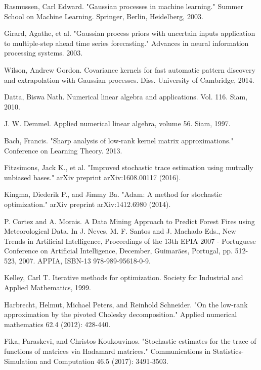 \documentclass{article}
\begin{document}
\begin{thebibliography}{1}

Rasmussen, Carl Edward. "Gaussian processes in machine learning." Summer School on Machine Learning. Springer, Berlin, Heidelberg, 2003.

Girard, Agathe, et al. "Gaussian process priors with uncertain inputs application to multiple-step ahead time series forecasting." Advances in neural information processing systems. 2003.

Wilson, Andrew Gordon. Covariance kernels for fast automatic pattern discovery and extrapolation with Gaussian processes. Diss. University of Cambridge, 2014.

Datta, Biswa Nath. Numerical linear algebra and applications. Vol. 116. Siam, 2010.

J. W. Demmel. Applied numerical linear algebra, volume 56. Siam, 1997. 

Bach, Francis. "Sharp analysis of low-rank kernel matrix approximations." Conference on Learning Theory. 2013.

Fitzsimons, Jack K., et al. "Improved stochastic trace estimation using mutually unbiased bases." arXiv preprint arXiv:1608.00117 (2016).

Kingma, Diederik P., and Jimmy Ba. "Adam: A method for stochastic optimization." arXiv preprint arXiv:1412.6980 (2014).

P. Cortez and A. Morais. A Data Mining Approach to Predict Forest Fires using Meteorological Data. In J. Neves, M. F. Santos and J. Machado Eds., New Trends in Artificial Intelligence, Proceedings of the 13th EPIA 2007 - Portuguese Conference on Artificial Intelligence, December, Guimarães, Portugal, pp. 512-523, 2007. APPIA, ISBN-13 978-989-95618-0-9.

Kelley, Carl T. Iterative methods for optimization. Society for Industrial and Applied Mathematics, 1999.

Harbrecht, Helmut, Michael Peters, and Reinhold Schneider. "On the low-rank approximation by the pivoted Cholesky decomposition." Applied numerical mathematics 62.4 (2012): 428-440.

Fika, Paraskevi, and Christos Koukouvinos. "Stochastic estimates for the trace of functions of matrices via Hadamard matrices." Communications in Statistics-Simulation and Computation 46.5 (2017): 3491-3503.


\end{thebibliography}
\end{document}
